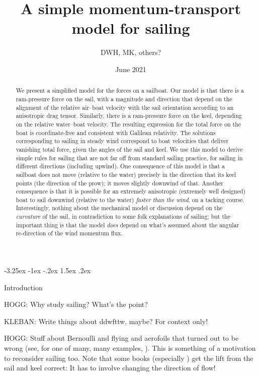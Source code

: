 \documentclass[letterpaper]{article}
\title{\bfseries%
A simple momentum-transport model for sailing}
\author{DWH, MK, others?}
\date{June 2021}
\makeatletter
\renewcommand\section{\@startsection {section}{1}{\z@}%
  {-3.25ex \@plus -1ex \@minus -.2ex}%
  {1.5ex \@plus .2ex}%
  {\raggedright\normalfont\large\bfseries}}
\makeatother
\begin{document}
\maketitle

\begin{abstract}\noindent
    We present a simplified model for the forces on a sailboat.
    Our model is that there is a ram-pressure force on the sail, with a magnitude and direction that depend on the alignment of the relative air--boat velocity with the sail orientation according to an anisotropic drag tensor.
    Similarly, there is a ram-pressure force on the keel, depending on the relative water--boat velocity.
    The resulting expression for the total force on the boat is coordinate-free and consistent with Galilean relativity.
    The solutions corresponding to sailing in steady wind correspond to boat velocities that deliver vanishing total force, given the angles of the sail and keel.
    We use this model to derive simple rules for sailing that are not far off from standard sailing practice, for sailing in different directions (including upwind).
    One consequence of this model is that a sailboat does not move (relative to the water) precisely in the direction that its keel points (the direction of the prow); it moves slightly downwind of that.
    Another consequence is that it is possible for an extremely anisotropic (extremely well designed) boat to sail downwind (relative to the water) \emph{faster than the wind}, on a tacking course.
    Interestingly, nothing about the mechanical model or discussion depend on the \emph{curvature} of the sail, in contradiction to some folk explanations of sailing; but the important thing is that the model \emph{does} depend on what's assumed about the angular re-direction of the wind momentum flux.
\end{abstract}

\section{Introduction}\label{sec:intro}

HOGG: Why study sailing? What's the point?

KLEBAN: Write things about ddwfttw, maybe? For context only!

HOGG: Stuff about Bernoulli and flying and aerofoils that turned out to be wrong (see, for one of many, many examples, \cite{lift}).
This is something of a motivation to reconsider sailing too.
Note that some books (especially \cite{sails}) get the lift from the sail and keel correct: It has to involve changing the direction of flow!
\end{document}
